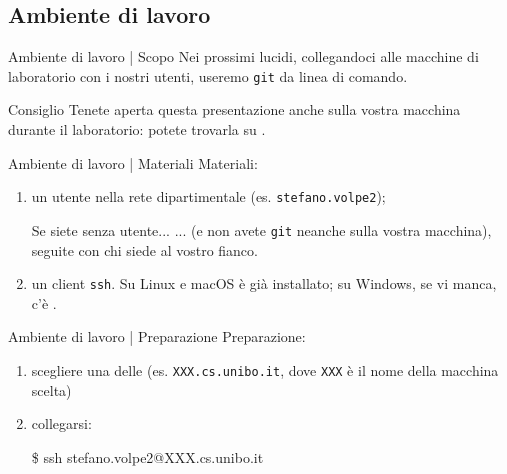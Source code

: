 \documentclass{beamer}
\begin{document}
\subsection{Ambiente di lavoro}
\begin{frame}{Ambiente di lavoro | Scopo}
  Nei prossimi lucidi, collegandoci alle macchine di laboratorio con i nostri
  utenti, useremo \texttt{git} da linea di comando.\pause
  \begin{block}{Consiglio}
    Tenete aperta questa presentazione anche sulla vostra macchina durante il
    laboratorio: potete trovarla su
    \href{https://csunibo.github.io/lab}{}.
  \end{block}
\end{frame}

\begin{frame}{Ambiente di lavoro | Materiali}
  Materiali:
  \begin{enumerate}
    \item<1->un utente nella rete dipartimentale (es. \texttt{stefano.volpe2});
      \begin{alertblock}{Se siete senza utente...}
        ... (e non avete \texttt{git} neanche sulla vostra macchina), seguite con
        chi siede al vostro fianco.
      \end{alertblock}\pause
    \item<2->un client \texttt{ssh}. Su Linux e macOS è già installato; su
      Windows, se vi manca, c'è
      \href{https://www.chiark.greenend.org.uk/~sgtatham/putty/latest.html}{}.
  \end{enumerate}
\end{frame}

\begin{frame}{Ambiente di lavoro | Preparazione}
  Preparazione:
  \begin{enumerate}
    \item<1->scegliere una delle \href{https://disi.unibo.it/it/dipartimento/servizi-tecnici-e-amministrativi/servizi-informatici/accesso-remoto}{} (es. \texttt{XXX.cs.unibo.it}, dove \texttt{XXX} è il
      nome della macchina scelta)
    \item<2-> collegarsi:
      \begin{semiverbatim}
        \$ ssh stefano.volpe2@XXX.cs.unibo.it
      \end{semiverbatim}
  \end{enumerate}
\end{frame}
\end{document}
